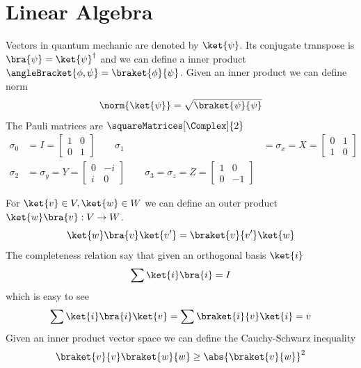\chapter{Linear Algebra}
Vectors in quantum mechanic are denoted by \(\ket{\psi}\). Its conjugate transpose is \(\bra{\psi} = \ket{\psi}^{\dagger}\) and we can define a inner product \(\angleBracket{\phi,\psi} = \braket{\phi}{\psi}\). Given an inner product we can define norm 
\begin{equation*}
    \norm{\ket{\psi}} = \sqrt{\braket{\psi}{\psi}}
\end{equation*}
The Pauli matrices are \(\squareMatrices[\Complex]{2}\) 
\begin{align*}
    \sigma_0 &= I = \begin{bmatrix}
        1 & 0\\
        0 & 1 
    \end{bmatrix} \qquad \sigma_1 &= \sigma_x = X = \begin{bmatrix}
        0 & 1 \\
        1 & 0 
    \end{bmatrix}\\
    \sigma_2 &= \sigma_y = Y = \begin{bmatrix}
        0 & -i \\
        i & 0
    \end{bmatrix} \qquad \sigma_3 = \sigma_z= Z = \begin{bmatrix}
        1 & 0 \\
        0 & -1 
    \end{bmatrix}
\end{align*}

For \(\ket{v} \in V, \ket{w} \in W\) we can define an outer product \(\ket{w}\bra{v} : V \to W\). 
\begin{equation*}
    \ket{w} \bra{v} \ket{v'} = \braket{v}{v'} \ket{w}
\end{equation*}
The completeness relation say that given an orthogonal basis \(\ket{i}\) 
\begin{equation*}
    \sum \ket{i} \bra{i} = I 
\end{equation*}
which is easy to see 
\begin{equation*}
    \sum \ket{i} \bra{i} \ket{v} = \sum \braket{i}{v} \ket{i} = v
\end{equation*}
Given an inner product vector space we can define the Cauchy-Schwarz inequality 
\begin{equation*}
    \braket{v}{v} \braket{w}{w} \geq \abs{\braket{v}{w}}^2
\end{equation*}

